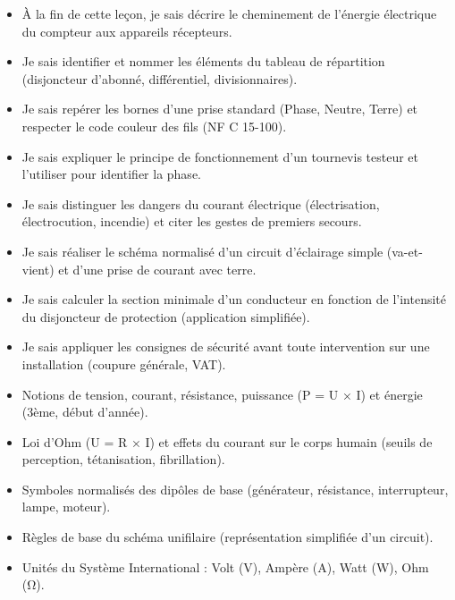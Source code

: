 \documentclass[11pt]{article}
\begin{document}
\begin{objectifs}
\begin{itemize}
\item À la fin de cette leçon, je sais décrire le cheminement de l'énergie électrique du compteur aux appareils récepteurs.
\item Je sais identifier et nommer les éléments du tableau de répartition (disjoncteur d'abonné, différentiel, divisionnaires).
\item Je sais repérer les bornes d'une prise standard (Phase, Neutre, Terre) et respecter le code couleur des fils (NF C 15-100).
\item Je sais expliquer le principe de fonctionnement d'un tournevis testeur et l'utiliser pour identifier la phase.
\item Je sais distinguer les dangers du courant électrique (électrisation, électrocution, incendie) et citer les gestes de premiers secours.
\item Je sais réaliser le schéma normalisé d'un circuit d'éclairage simple (va-et-vient) et d'une prise de courant avec terre.
\item Je sais calculer la section minimale d'un conducteur en fonction de l'intensité du disjoncteur de protection (application simplifiée).
\item Je sais appliquer les consignes de sécurité avant toute intervention sur une installation (coupure générale, VAT).
\end{itemize}
\end{objectifs}

\begin{prerequis}
\begin{itemize}
\item Notions de tension, courant, résistance, puissance (P = U × I) et énergie (3ème, début d'année).
\item Loi d'Ohm (U = R × I) et effets du courant sur le corps humain (seuils de perception, tétanisation, fibrillation).
\item Symboles normalisés des dipôles de base (générateur, résistance, interrupteur, lampe, moteur).
\item Règles de base du schéma unifilaire (représentation simplifiée d'un circuit).
\item Unités du Système International : Volt (V), Ampère (A), Watt (W), Ohm (Ω).
\end{itemize}
\end{prerequis}

\newpage
\end{document}
